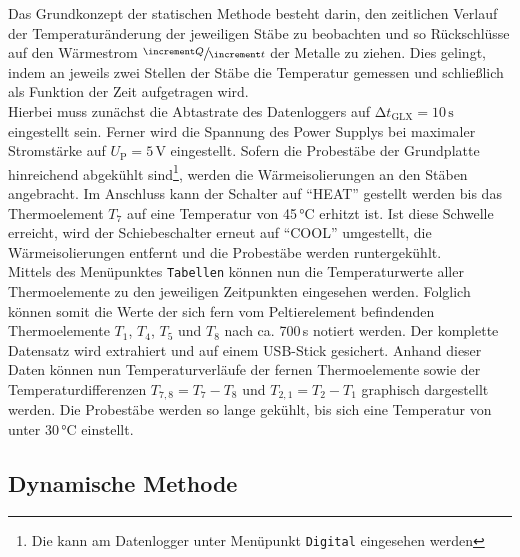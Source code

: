 Das Grundkonzept der statischen Methode besteht darin, den zeitlichen Verlauf der Temperaturänderung der jeweiligen Stäbe zu beobachten und so Rückschlüsse auf den
Wärmestrom $\sfrac{\increment Q}{\increment t}$ der Metalle zu ziehen. Dies gelingt, indem an jeweils zwei Stellen der Stäbe die Temperatur gemessen und schließlich als Funktion der Zeit aufgetragen wird. \\
Hierbei muss zunächst die Abtastrate des Datenloggers auf $\increment t_\text{GLX} = 10\,\unit{\second}$ eingestellt sein. Ferner wird die Spannung des Power Supplys bei maximaler Stromstärke auf 
$U_\text{P} = 5\,\unit{\volt}$ eingestellt. Sofern die Probestäbe der Grundplatte hinreichend abgekühlt sind\footnote{Die kann am Datenlogger unter Menüpunkt \texttt{Digital} eingesehen werden},
werden die Wärmeisolierungen an den Stäben angebracht. Im Anschluss kann der Schalter auf \enquote{HEAT} gestellt werden bis das Thermoelement $T_7$ auf eine Temperatur von 45\,\unit{\celsius}
erhitzt ist. Ist diese Schwelle erreicht, wird der Schiebeschalter erneut auf \enquote{COOL} umgestellt, die Wärmeisolierungen entfernt und die Probestäbe werden runtergekühlt. \\
Mittels des Menüpunktes \texttt{Tabellen} können nun die Temperaturwerte aller Thermoelemente zu den jeweiligen Zeitpunkten eingesehen werden. Folglich können somit die Werte der
sich fern vom Peltierelement befindenden Thermoelemente $T_1$, $T_4$, $T_5$ und $T_8$ nach ca. 700\,\unit{\second} notiert werden. Der komplette Datensatz wird extrahiert und auf einem USB-Stick
gesichert. Anhand dieser Daten können nun Temperaturverläufe der fernen Thermoelemente sowie der Temperaturdifferenzen $T_{7,8} = T_7 - T_8$ und $T_{2,1} = T_2 - T_1$ graphisch dargestellt werden.
Die Probestäbe werden so lange gekühlt, bis sich eine Temperatur von unter 30\,\unit{\celsius} einstellt.

\subsection{Dynamische Methode}
\label{sec:Dynamische Methode}

